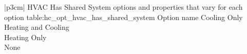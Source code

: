 \begin{customLongTable}{ |p{3cm}| }
{HVAC Has Shared System options and properties that vary for each option} {table:hc_opt_hvac_has_shared_system}
{Option name}
Cooling Only \\ \hline
Heating and Cooling \\ \hline
Heating Only \\ \hline
None \\
\end{customLongTable}
